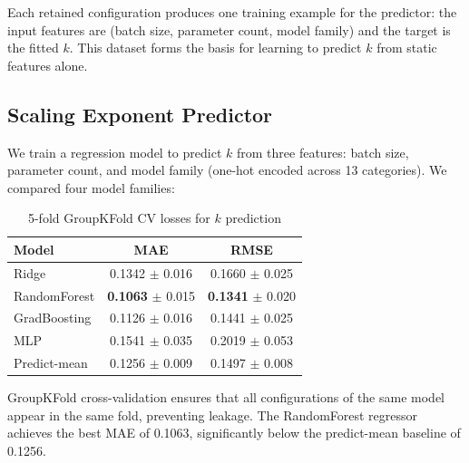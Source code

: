 \documentclass[letterpaper,10pt]{article}
\begin{document}
Each retained configuration produces one training example for the predictor: the input features are (batch size, parameter count, model family) and the target is the fitted $k$. This dataset forms the basis for learning to predict $k$ from static features alone.

\subsection{Scaling Exponent Predictor}

We train a regression model to predict $k$ from three features: batch size, parameter count, and model family (one-hot encoded across 13 categories). We compared four model families:

\begin{table}[h]
\centering
\caption{5-fold GroupKFold CV losses for $k$ prediction}
\label{tab:cv_results}
\begin{tabular}{lcc}
\toprule
Model & MAE & RMSE \\
\midrule
Ridge & 0.1342 $\pm$ 0.016 & 0.1660 $\pm$ 0.025 \\
RandomForest & \textbf{0.1063} $\pm$ 0.015 & \textbf{0.1341} $\pm$ 0.020 \\
GradBoosting & 0.1126 $\pm$ 0.016 & 0.1441 $\pm$ 0.025 \\
MLP & 0.1541 $\pm$ 0.035 & 0.2019 $\pm$ 0.053 \\
\midrule
Predict-mean & 0.1256 $\pm$ 0.009 & 0.1497 $\pm$ 0.008 \\
\bottomrule
\end{tabular}
\end{table}

GroupKFold cross-validation ensures that all configurations of the same model appear in the same fold, preventing leakage. The RandomForest regressor achieves the best MAE of 0.1063, significantly below the predict-mean baseline of 0.1256.
\end{document}
